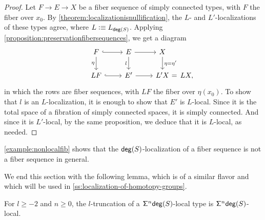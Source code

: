 \begin{proof}
    Let $F \to E \to X$ be a fiber sequence of simply connected types, with $F$ the fiber over $x_0$.
    By \cref{theorem:localizationisnullification}, the $L$- and $L'$-localizations
    of these types agree, where $L \vcentcolon\equiv L_{\mathsf{deg}(S)}$.
    Applying \cref{proposition:preservationfibersequences}, we get a diagram
\begin{equation*}
\begin{tikzcd}
F \arrow[d,swap,"\eta"] \arrow[r,hookrightarrow] & E \arrow[d,swap,"l"] \arrow[r] & X \arrow[d,"\eta=\eta'"] \\
LF \arrow[r,hookrightarrow] & E' \arrow[r] & L'X \mathrlap{\,\,=\, L X ,}
\end{tikzcd}
\end{equation*}
    in which the rows are fiber sequences, with $L F$ the fiber over $\eta(x_0)$.
    To show that $l$ is an $L$-localization, it is enough to show that $E'$ is $L$-local.
    Since it is the total space of a fibration of simply connected spaces,
    it is simply connected. And since it is $L'$-local,
    by the same proposition, we deduce that it is $L$-local, as needed.
\end{proof}

\cref{example:nonlocalfib} shows that the $\mathsf{deg}(S)$-localization of a
fiber sequence is not a fiber sequence in general.

\medskip

We end this section with the following lemma, which is of a similar
flavor and which will be used in \cref{ss:localization-of-homotopy-groups}.

\begin{lem}\label{lemma:truncationpreserveslocal}
    For $l \geq -2$ and $n \geq 0$, the $l$-truncation of a $\mathsf{\Sigma}^n \mathsf{deg}(S)$-local type is $\mathsf{\Sigma}^n \mathsf{deg}(S)$-local.
\end{lem}

